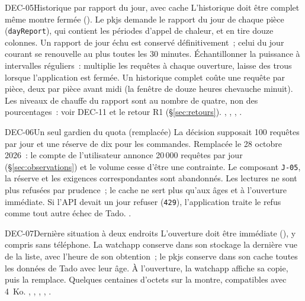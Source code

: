 \begin{decision}{DEC-05}{Historique par rapport du jour, avec cache}
   L'historique doit être complet même montre fermée ().
   Le pkjs demande le rapport du jour de chaque pièce (\texttt{dayReport}), qui
  contient les périodes d'appel de chaleur, et en tire douze colonnes. Un rapport de jour échu
  est conservé définitivement~; celui du jour courant se renouvelle au plus toutes les 30 minutes.
   Échantillonner la puissance à intervalles réguliers~: multiplie les requêtes à chaque ouverture, laisse des trous lorsque l'application est fermée.
   Un historique complet coûte une requête par pièce, deux par pièce avant
  midi (la fenêtre de douze heures chevauche minuit). Les niveaux de chauffe du rapport sont au
  nombre de quatre, non des pourcentages~: voir DEC-11 et le retour R1 (§\ref{sec:retours}).
   , , , .
\end{decision}

\begin{decision}{DEC-06}{Un seul gardien du quota (remplacée)}
   La décision supposait 100 requêtes par jour et une réserve de dix pour les commandes.
   Remplacée le 28 octobre 2026~: le compte de l'utilisateur annonce 20\,000 requêtes
  par jour (§\ref{sec:observations}) et le volume cesse d'être une contrainte. Le composant \texttt{J-05}, la
  réserve et les exigences correspondantes sont abandonnés.
   Les lectures ne sont plus refusées par prudence~; le cache ne sert plus qu'aux
  âges et à l'ouverture immédiate. Si l'API devait un jour refuser (\texttt{429}), l'application traite le
  refus comme tout autre échec de Tado.
   .
\end{decision}

\begin{decision}{DEC-07}{Dernière situation à deux endroits}
   L'ouverture doit être immédiate (), y compris sans téléphone.
   La watchapp conserve dans son stockage la dernière vue de la liste, avec
  l'heure de son obtention~; le pkjs conserve dans son cache toutes les données de Tado
  avec leur âge. À l'ouverture, la watchapp affiche sa copie, puis la remplace.
   Quelques centaines d'octets sur la montre, compatibles avec 4~Ko.
   , , ,
  , .
\end{decision}

